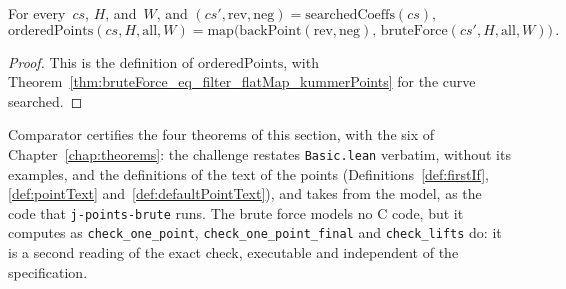 \begin{theorem}
  \label{thm:orderedPoints_eq_map_bruteForce}
  \leanok
  For every~$cs$, $H$,  and~$W$, and $(cs', \mathrm{rev}, \mathrm{neg}) =
  \mathrm{searchedCoeffs}(cs)$,
  \[ \mathrm{orderedPoints}(cs, H, \mathrm{all}, W)
     = \mathrm{map}\bigl(\mathrm{backPoint}(\mathrm{rev}, \mathrm{neg}),\,
       \mathrm{bruteForce}(cs', H, \mathrm{all}, W)\bigr)\,. \]
\end{theorem}

\begin{proof}\leanok
  This is the definition of $\mathrm{orderedPoints}$, with
  Theorem~\ref{thm:bruteForce_eq_filter_flatMap_kummerPoints} for the curve searched.
\end{proof}

\begin{remark}\label{rem:specBruteForceC}
  Comparator certifies the four theorems of this section, with the six of
  Chapter~\ref{chap:theorems}: the challenge restates \verb|Basic.lean| verbatim, without its
  examples,  and the definitions of the text of the points
  (Definitions~\ref{def:firstIf}, \ref{def:pointText} and~\ref{def:defaultPointText}), and takes
   from the model, as the code that \verb|j-points-brute| runs. The brute
  force models no C code, but it computes as \texttt{check\_one\_point},
  \texttt{check\_one\_point\_final} and \texttt{check\_lifts} do: it is a second reading of the
  exact check, executable and independent of the specification.
\end{remark}

